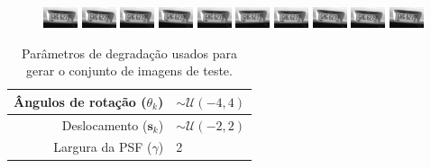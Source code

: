 \begin{figure}[H]
	\includegraphics{figures/degradedImg2/result-10.png}
	\includegraphics{figures/degradedImg2/result-11.png}
	\includegraphics{figures/degradedImg2/result-12.png}
	\includegraphics{figures/degradedImg2/result-13.png}
	\includegraphics{figures/degradedImg2/result-14.png}
	\includegraphics{figures/degradedImg2/result-15.png}
	\includegraphics{figures/degradedImg2/result-16.png}
	\includegraphics{figures/degradedImg2/result-17.png}
	\includegraphics{figures/degradedImg2/result-18.png}
	\includegraphics{figures/degradedImg2/result-19.png}
	
\end{figure}

\begin{table}[h]
	\centering
	\caption{Parâmetros de degradação usados para gerar o conjunto de imagens de teste.}
	\label{tab:resumoParametros}
	\begin{tabular}{r | l}
		Ângulos de rotação ($\theta_k$) & $ \sim \mathcal{U}(-4, 4)$ \\ \hline
		Deslocamento ($\mathbf{s}_k$)& $\sim \mathcal{U}(-2,2)$\\ \hline
		Largura da PSF ($\gamma$) & 2 \\ \hline

	\end{tabular}
\end{table}

